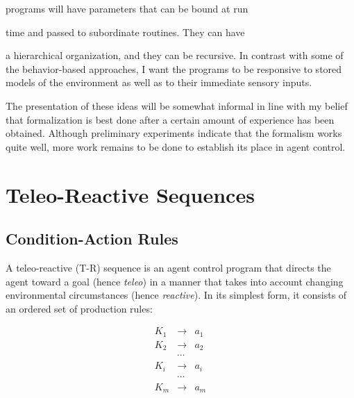 programs will have parameters that can be bound at run 

time and passed to subordinate routines. They can have 

a hierarchical organization, and they can be recursive.  In contrast with  
some of the behavior-based approaches, I  want the programs to be responsive  
to stored models of the environment as well as to their immediate sensory  
inputs.

The presentation of these ideas will be somewhat informal in line with my  
belief that formalization is best done after a certain amount of experience  
has been obtained.  Although preliminary experiments indicate that the  
formalism works quite well, more work remains to be done to establish its  
place in agent control.

\section{Teleo-Reactive Sequences}  


\subsection{Condition-Action Rules}

A teleo-reactive (T-R) sequence is an agent control program that directs the  
agent toward a goal (hence {\it teleo}) in a manner that takes into account  
changing environmental circumstances (hence {\it reactive}).  In its simplest  
form, it consists of an ordered set of production rules:

\begin{eqnarray*}
K_1 & \rightarrow & a_1 \\
K_2 & \rightarrow & a_2 \\
 & \cdots &  \\
 K_i & \rightarrow & a_i  \\
 & \cdots &  \\
  K_m & \rightarrow & a_m  

\end{eqnarray*}

